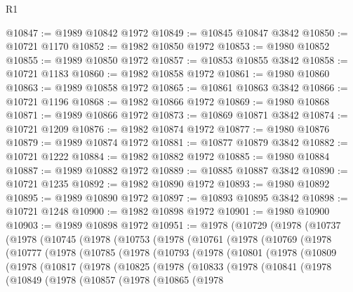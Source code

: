 \begin{lexlean}{R1}
\begin{coremodule}
@10847 := @1989 @10842 @1972
@10849 := @10845 @10847 @3842
@10850 := @10721 @1170
@10852 := @1982 @10850 @1972
@10853 := @1980 @10852
@10855 := @1989 @10850 @1972
@10857 := @10853 @10855 @3842
@10858 := @10721 @1183
@10860 := @1982 @10858 @1972
@10861 := @1980 @10860
@10863 := @1989 @10858 @1972
@10865 := @10861 @10863 @3842
@10866 := @10721 @1196
@10868 := @1982 @10866 @1972
@10869 := @1980 @10868
@10871 := @1989 @10866 @1972
@10873 := @10869 @10871 @3842
@10874 := @10721 @1209
@10876 := @1982 @10874 @1972
@10877 := @1980 @10876
@10879 := @1989 @10874 @1972
@10881 := @10877 @10879 @3842
@10882 := @10721 @1222
@10884 := @1982 @10882 @1972
@10885 := @1980 @10884
@10887 := @1989 @10882 @1972
@10889 := @10885 @10887 @3842
@10890 := @10721 @1235
@10892 := @1982 @10890 @1972
@10893 := @1980 @10892
@10895 := @1989 @10890 @1972
@10897 := @10893 @10895 @3842
@10898 := @10721 @1248
@10900 := @1982 @10898 @1972
@10901 := @1980 @10900
@10903 := @1989 @10898 @1972
@10951 := @1978
    (@10729
      (@1978
        (@10737
          (@1978
            (@10745
              (@1978
                (@10753
                  (@1978
                    (@10761
                      (@1978
                        (@10769
                          (@1978
                            (@10777
                              (@1978
                                (@10785
                                  (@1978
                                    (@10793
                                      (@1978
                                        (@10801
                                          (@1978
                                            (@10809
                                              (@1978
                                                (@10817
                                                  (@1978
                                                    (@10825
                                                      (@1978
                                                        (@10833
                                                          (@1978
                                                            (@10841
                                                              (@1978
                                                                (@10849
                                                                  (@1978
                                                                    (@10857
                                                                      (@1978
                                                                        (@10865
                                                                          (@1978

\end{coremodule}
\end{lexlean}
